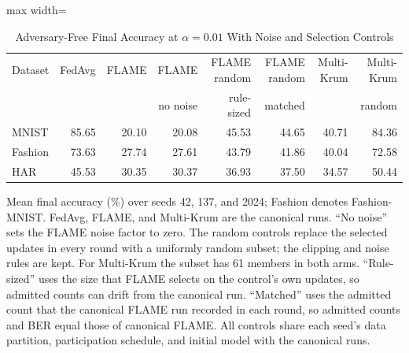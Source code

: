 \begin{table}[!tp]
\centering\footnotesize
\setlength{\tabcolsep}{4pt}
\caption{Adversary-Free Final Accuracy at $\alpha=0.01$ With Noise and Selection Controls}\label{tab:review_e3}
\begin{adjustbox}{max width=\textwidth}
\begin{tabular}{lrrrrrrr}
\toprule
Dataset & FedAvg & FLAME & FLAME & FLAME random & FLAME random & Multi-Krum & Multi-Krum \\
 &  &  & no noise & rule-sized & matched &  & random \\
\midrule
MNIST & 85.65 & 20.10 & 20.08 & 45.53 & 44.65 & 40.71 & 84.36 \\
Fashion & 73.63 & 27.74 & 27.61 & 43.79 & 41.86 & 40.04 & 72.58 \\
HAR & 45.53 & 30.35 & 30.37 & 36.93 & 37.50 & 34.57 & 50.44 \\
\bottomrule
\end{tabular}
\end{adjustbox}

\par\vspace{3pt}\parbox{\linewidth}{\footnotesize Mean final accuracy (\%) over seeds 42, 137, and 2024; Fashion denotes Fashion-MNIST. FedAvg, FLAME, and Multi-Krum are the canonical runs. ``No noise'' sets the FLAME noise factor to zero. The random controls replace the selected updates in every round with a uniformly random subset; the clipping and noise rules are kept. For Multi-Krum the subset has 61 members in both arms. ``Rule-sized'' uses the size that FLAME selects on the control's own updates, so admitted counts can drift from the canonical run. ``Matched'' uses the admitted count that the canonical FLAME run recorded in each round, so admitted counts and BER equal those of canonical FLAME. All controls share each seed's data partition, participation schedule, and initial model with the canonical runs.}
\end{table}
